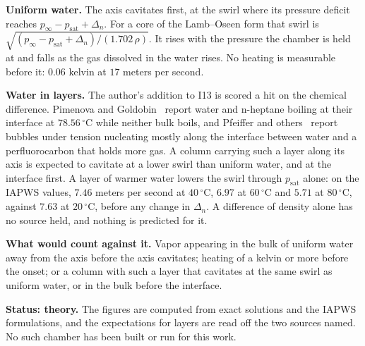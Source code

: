 \textbf{Uniform water.} The axis cavitates first, at the swirl where its pressure deficit reaches
$p_\infty - p_{\mathrm{sat}} + \Delta_n$. For a core of the Lamb--Oseen form that swirl is
$\sqrt{(p_\infty - p_{\mathrm{sat}} + \Delta_n)/(1.702\,\rho)}$. It rises with the pressure the
chamber is held at and falls as the gas dissolved in the water rises. No heating is measurable
before it: $0.06$ kelvin at $17$ meters per second.

\textbf{Water in layers.} The author's addition to I13 is scored a hit on the chemical difference.
Pimenova and Goldobin~\cite{src:Pimenova-and-Goldobin-2014} report water and n-heptane boiling at
their interface at $78.56\,^\circ$C while neither bulk boils, and Pfeiffer and
others~\cite{src:Pfeiffer-et-al-2023} report bubbles under tension nucleating mostly along the
interface between water and a perfluorocarbon that holds more gas. A column carrying such a layer
along its axis is expected to cavitate at a lower swirl than uniform water, and at the interface
first. A layer of warmer water lowers the swirl through $p_{\mathrm{sat}}$ alone: on the IAPWS
values, $7.46$ meters per second at $40\,^\circ$C, $6.97$ at $60\,^\circ$C and $5.71$ at
$80\,^\circ$C, against $7.63$ at $20\,^\circ$C, before any change in $\Delta_n$. A difference
of density alone has no source held, and nothing is predicted for it.

\textbf{What would count against it.} Vapor appearing in the bulk of uniform water away from the
axis before the axis cavitates; heating of a kelvin or more before the onset; or a column with such a layer
that cavitates at the same swirl as uniform water, or in the bulk before the interface.

\textbf{Status: theory.} The figures are computed from exact solutions and the IAPWS formulations,
and the expectations for layers are read off the two sources named. No such chamber has been
built or run for this work.
